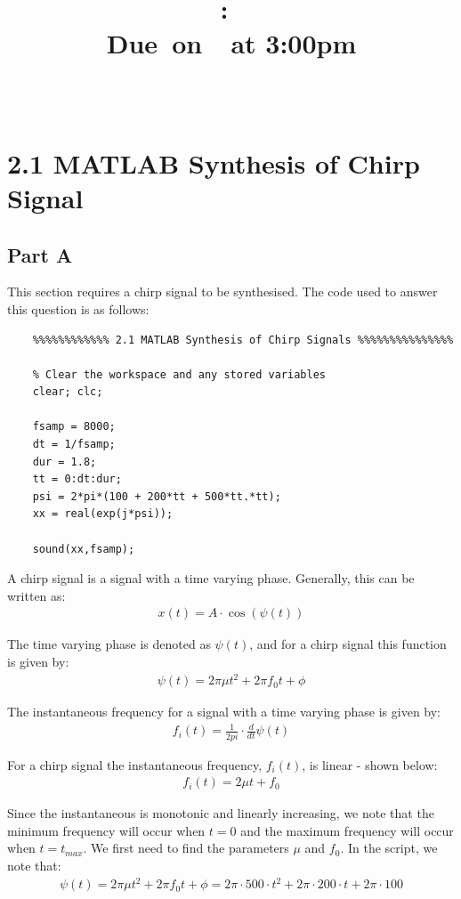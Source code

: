 \documentclass{article}
\title{
    \vspace{2in}
    \textmd{\textbf{\hmwkClass:\ \hmwkTitle}}\\
    \normalsize\vspace{0.1in}\small{Due\ on\ \hmwkDueDate\ at 3:00pm}\\
    \vspace{0.1in}\large{\textit{\hmwkClassInstructor\ \hmwkClassTime}}
    \vspace{3in}
}
\author{\textbf{\hmwkAuthorName}}
\date{}
\begin{document}
\maketitle

\pagebreak


\section{2.1 MATLAB Synthesis of Chirp Signal}
\subsection{Part A}
This section requires a chirp signal to be synthesised. The code used to answer this question is as follows:

\begin{lstlisting}
	%%%%%%%%%%%% 2.1 MATLAB Synthesis of Chirp Signals %%%%%%%%%%%%%%%
	
	% Clear the workspace and any stored variables
	clear; clc;
	
	fsamp = 8000;
	dt = 1/fsamp;
	dur = 1.8;
	tt = 0:dt:dur;
	psi = 2*pi*(100 + 200*tt + 500*tt.*tt);
	xx = real(exp(j*psi));
	
	sound(xx,fsamp);
\end{lstlisting}

A chirp signal is a signal with a time varying phase. Generally, this can be written as:
\begin{align}
	x(t) = A \cdot \cos(\psi(t))
\end{align}

The time varying phase is denoted as $\psi(t)$, and for a chirp signal this function is given by:
\begin{align}
	\psi(t) = 2 \pi \mu t^2 + 2 \pi f_0 t + \phi
\end{align}

The instantaneous frequency for a signal with a time varying phase is given by:
\begin{align}
	f_i(t) = \frac{1}{2 pi} \cdot \frac{d}{dt} \psi(t)
\end{align}

For a chirp signal the instantaneous frequency, $f_i(t)$, is linear - shown below:
\begin{align}
	 f_i(t)= 2 \mu t + f_0
\end{align}

Since the instantaneous is monotonic and linearly increasing, we note that the minimum frequency will occur when $t = 0$ and the maximum frequency will occur when $t = t_{max}$. We first need to find the parameters $\mu$ and $f_0$. In the script, we note that:
\begin{align}
	\psi(t) = 2 \pi \mu t^2 + 2 \pi f_0 t + \phi = 2 \pi \cdot 500 \cdot t^2 + 2 \pi \cdot 200 \cdot t + 2 \pi \cdot 100
\end{align}
\end{document}
